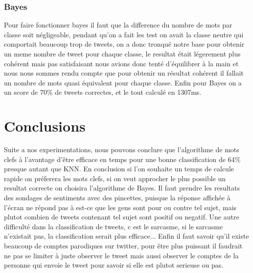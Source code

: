 \documentclass[a4paper,10pt]{report}
\begin{document}
    \subsection{Bayes}
      Pour faire fonctionner bayes il faut que la difference du nombre de mots par classe soit négligeable, pendant qu'on a fait les test on avait la classe neutre qui comportait
      beaucoup trop de tweets, on a donc tronqué notre base pour obtenir un meme nombre de tweet pour chaque classe, le resultat était légerement plus cohérent mais pas satisfaisant
      nous avions donc tenté d'équilibrer à la main et nous nous sommes rendu compte que pour obtenir un résultat cohérent il fallait un nombre de mots quasi équivalent pour chaque classe.
      Enfin pour Bayes on a un score de 70\% de tweets correctes, et le tout calculé en 1307ms.
    
    
\chapter{Conclusions}
Suite a nos experimentations, nous pouvons conclure que l'algorithme de mots clefs à l'avantage d'être efficace en temps pour une bonne classification de 64\%
presque autant que KNN. En conclusion si l'on souhaite un temps de calcule rapide on préferera les mots clefs, si on veut approcher le plus possible un resultat correcte
on choisira l'algorithme de Bayes. 
Il faut prendre les resultats des sondages de sentiments avec des pincettes, puisque la réponse affichée à l'écran ne répond pas à 
est-ce que les gens sont pour ou contre tel sujet, mais plutot combien de tweets contenant tel sujet sont positif ou negatif.
Une autre difficulté dans la classification de tweets, c est le sarcasme, si le sarcasme n'existait pas, la classification serait plus efficace...
Enfin il faut savoir qu'il existe beaucoup de comptes parodiques sur twitter, pour être plus puissant il faudrait ne pas se limiter à juste observer le tweet mais
aussi observer le comptes de la personne qui envoie le tweet pour savoir si elle est plutot serieuse ou pas.
\end{document}
